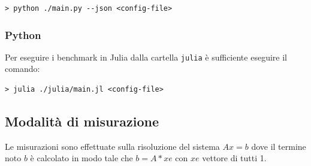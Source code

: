 \documentclass[a4paper, 12pt]{article}
\begin{document}
\begin{lstlisting}[frame=single]
> python ./main.py --json <config-file>
\end{lstlisting}

        \subsubsection{Python}
            Per eseguire i benchmark in Julia dalla cartella \texttt{julia} è
            sufficiente eseguire il comando:

\begin{lstlisting}[frame=single]
> julia ./julia/main.jl <config-file>
\end{lstlisting}

        \subsection{Modalità di misurazione}

            Le misurazioni sono effettuate sulla risoluzione del sistema $Ax = b$ dove il termine noto $b$ è calcolato
            in modo tale che $b = A*xe$ con $xe$ vettore di tutti 1.\\
\end{document}
